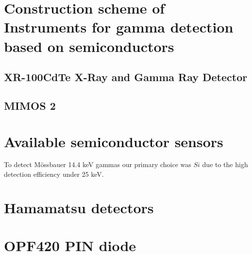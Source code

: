 \section{Construction scheme of Instruments for gamma detection based on semiconductors}





\subsection{XR-100CdTe X-Ray and Gamma Ray Detector}

\subsection{MIMOS 2}


\section{Available semiconductor sensors}
To detect Mössbauer 14.4 keV gammas our primary choice was $Si$ due to the high detection efficiency under 25 keV. 



\section{Hamamatsu detectors}

\section{OPF420 PIN diode}




